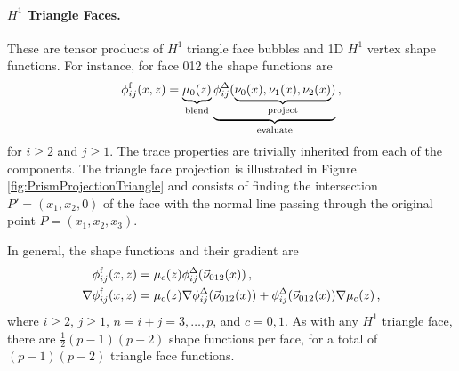 \paragraph{\texorpdfstring{$H^1$}{H1} Triangle Faces.} 
These are tensor products of $H^1$ triangle face bubbles and 1D $H^1$ vertex shape functions. 
For instance, for face 012 the shape functions are
\begin{equation*}
	\phi_{ij}^\mathrm{f}(x,z)=\underbrace{\mu_0(z)}_{\text{blend}}
		\underbrace{\phi_{ij}^\Delta(\underbrace{\nu_0(x),\nu_1(x),\nu_2(x)}_{\text{project}})}_{\text{evaluate}}\,,
\end{equation*}
for $i\geq2$ and $j\geq1$.
The trace properties are trivially inherited from each of the components.
The triangle face projection is illustrated in Figure \ref{fig:PrismProjectionTriangle} and consists of finding the intersection $P'=(x_1,x_2,0)$ of the face with the normal line passing through the original point $P=(x_1,x_2,x_3)$.

In general, the shape functions and their gradient are
\begin{equation}
	\begin{aligned}	
		\phi_{ij}^\mathrm{f}(x,z)&=\mu_c(z)\phi_{ij}^\Delta(\vec{\nu}_{012}(x))\,,\\
		\nabla\phi_{ij}^\mathrm{f}(x,z)&=\mu_c(z)\nabla\phi_{ij}^\Delta(\vec{\nu}_{012}(x))
			+\phi_{ij}^\Delta(\vec{\nu}_{012}(x))\nabla\mu_c(z)\,,
	\end{aligned}\label{eq:PrismH1TriFace}
\end{equation}
where $i\geq2$, $j\geq1$, $n=i+j=3,\ldots,p$, and $c=0,1$. 
As with any $H^1$ triangle face, there are $\frac{1}{2}(p-1)(p-2)$ shape functions per face, for a total of $(p-1)(p-2)$ triangle face  functions.

